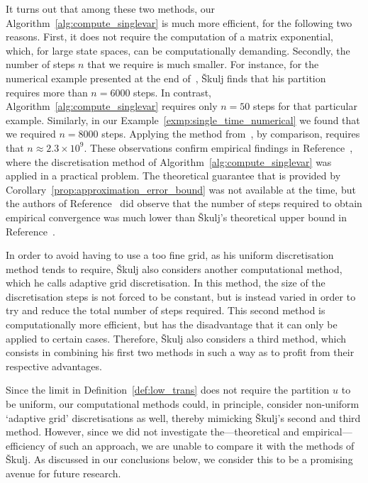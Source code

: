 \documentclass[10pt,a4paper]{paper}
\theoremstyle{definition}
\begin{document}
It turns out that among these two methods, our Algorithm~\ref{alg:compute_singlevar} is much more efficient, for the following two reasons. First, it does not require the computation of a matrix exponential, which, for large state spaces, can be computationally demanding. Secondly, the number of steps $n$ that we require is much smaller. For instance, for the numerical example presented at the end of~\cite[Section 4.1]{Skulj:2015cq}, {\v{S}}kulj finds that his partition requires more than $n=6000$ steps. In contrast, Algorithm~\ref{alg:compute_singlevar} requires only $n=50$ steps for that particular example. Similarly, in our Example~\ref{exmp:single_time_numerical} we found that we required $n=8000$ steps. Applying the method from~\cite{Skulj:2015cq}, by comparison, requires that $n\approx 2.3\times 10^9$. 
These observations confirm empirical findings in Reference~\cite{troffaes2015using}, where the discretisation method of Algorithm~\ref{alg:compute_singlevar} was applied in a practical problem. The theoretical guarantee that is provided by Corollary~\ref{prop:approximation_error_bound} was not available at the time, but the authors of Reference~\cite{troffaes2015using} did observe that the number of steps required to obtain empirical convergence was much lower than {\v{S}kulj}'s theoretical upper bound in Reference~\cite{Skulj:2015cq}.

In order to avoid having to use a too fine grid, as his uniform discretisation method tends to require, \v{S}kulj also considers another computational method, which he calls adaptive grid discretisation. In this method, the size of the discretisation steps is not forced to be constant, but is instead varied in order to try and reduce the total number of steps required. This second method is computationally more efficient, but has the disadvantage that it can only be applied to certain cases. Therefore, \v{S}kulj also considers a third method, which consists in combining his first two methods in such a way as to profit from their respective advantages. 

Since the limit in Definition~\ref{def:low_trans} does not require the partition $u$ to be uniform, our computational methods could, in principle, consider non-uniform `adaptive grid' discretisations as well, thereby mimicking \v{S}kulj's second and third method. However, since we did not investigate the---theoretical and empirical---efficiency of such an approach, we are unable to compare it with the methods of \v{S}kulj. As discussed in our conclusions below, we consider this to be a promising avenue for future research.
\end{document}
